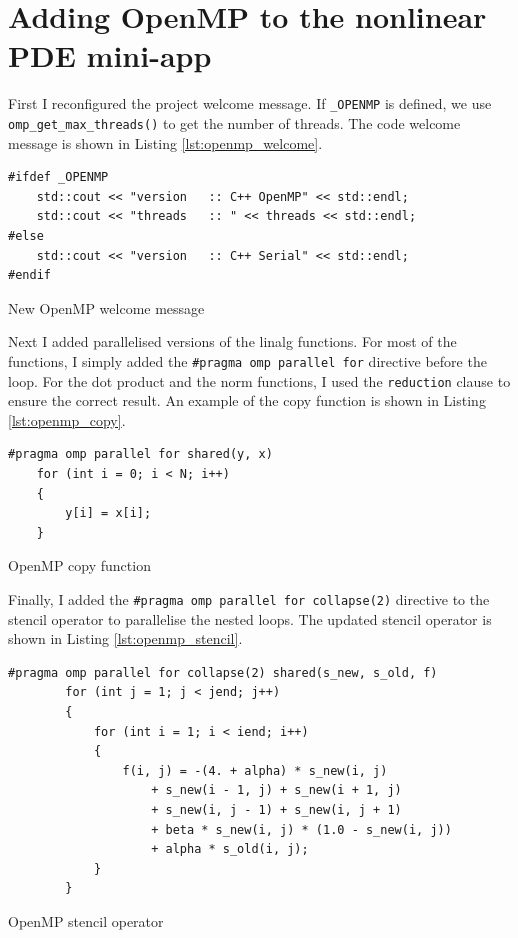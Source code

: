 \documentclass[unicode,11pt,a4paper,oneside,numbers=endperiod,openany]{scrartcl}
\begin{document}
\section{Adding OpenMP to the nonlinear PDE mini-app}

First I reconfigured the project welcome message. If \texttt{_OPENMP} is defined, we use \texttt{omp_get_max_threads()} to get the number of threads. The code welcome message is shown in Listing \ref{lst:openmp_welcome}.

\begin{listing}[h!t]
    \begin{verbatim}
#ifdef _OPENMP
    std::cout << "version   :: C++ OpenMP" << std::endl;
    std::cout << "threads   :: " << threads << std::endl;
#else
    std::cout << "version   :: C++ Serial" << std::endl;
#endif
    \end{verbatim}
    \caption{New OpenMP welcome message}
    \label{lst:openmp_welcome}
\end{listing}


Next I added parallelised versions of the linalg functions. For most of the functions, I simply added the \texttt{#pragma omp parallel for} directive before the loop. For the dot product and the norm functions, I used the \texttt{reduction} clause to ensure the correct result. An example of the copy function is shown in Listing \ref{lst:openmp_copy}.

\begin{listing}[h!t]
    \begin{verbatim}
#pragma omp parallel for shared(y, x)
    for (int i = 0; i < N; i++)
    {
        y[i] = x[i];
    }
    \end{verbatim}
    \caption{OpenMP copy function}
    \label{lst:openmp_copy}
\end{listing}

Finally, I added the \texttt{#pragma omp parallel for collapse(2)} directive to the stencil operator to parallelise the nested loops. The updated stencil operator is shown in Listing \ref{lst:openmp_stencil}.

\begin{listing}[h!t]
    \begin{verbatim}
#pragma omp parallel for collapse(2) shared(s_new, s_old, f)
        for (int j = 1; j < jend; j++)
        {
            for (int i = 1; i < iend; i++)
            {
                f(i, j) = -(4. + alpha) * s_new(i, j) 
                    + s_new(i - 1, j) + s_new(i + 1, j) 
                    + s_new(i, j - 1) + s_new(i, j + 1) 
                    + beta * s_new(i, j) * (1.0 - s_new(i, j)) 
                    + alpha * s_old(i, j);    
            }
        }
    \end{verbatim}
    \caption{OpenMP stencil operator}
    \label{lst:openmp_stencil}
\end{listing}
\end{document}
